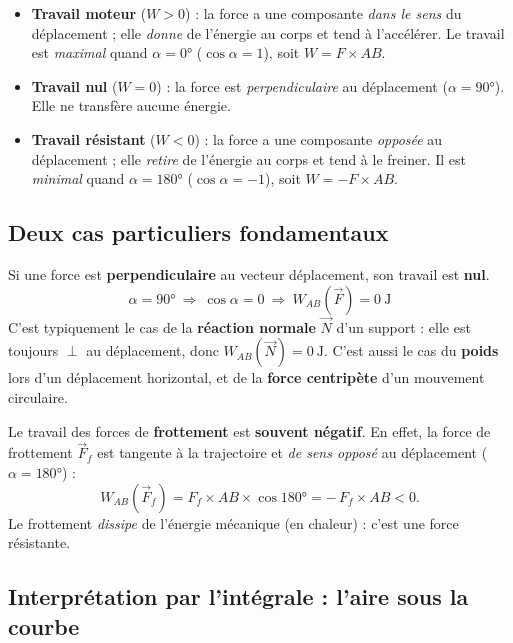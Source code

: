 \documentclass[11pt,a4paper]{article}
\newcommand{\vv}[1]{\vec{#1}}
\newcommand{\J}{\si{\joule}}
\begin{document}
\begin{itemize}[leftmargin=1.6em,topsep=2pt,itemsep=3pt]
  \item \textbf{Travail moteur} ($W>0$) : la force a une composante \emph{dans le sens} du
        déplacement ; elle \emph{donne} de l'énergie au corps et tend à l'accélérer. Le travail est
        \emph{maximal} quand $\alpha=\ang{0}$ ($\cos\alpha=1$), soit $W=F\times AB$.
  \item \textbf{Travail nul} ($W=0$) : la force est \emph{perpendiculaire} au déplacement
        ($\alpha=\ang{90}$). Elle ne transfère aucune énergie.
  \item \textbf{Travail résistant} ($W<0$) : la force a une composante \emph{opposée} au
        déplacement ; elle \emph{retire} de l'énergie au corps et tend à le freiner. Il est
        \emph{minimal} quand $\alpha=\ang{180}$ ($\cos\alpha=-1$), soit $W=-F\times AB$.
\end{itemize}

\subsection{Deux cas particuliers fondamentaux}

\begin{theoreme}
Si une force est \textbf{perpendiculaire} au vecteur déplacement, son travail est \textbf{nul}.
\[
\alpha=\ang{90}\ \Rightarrow\ \cos\alpha=0\ \Rightarrow\ W_{AB}(\vv F)=0\ \J
\]
C'est typiquement le cas de la \textbf{réaction normale} $\vv N$ d'un support : elle est toujours
$\perp$ au déplacement, donc $W_{AB}(\vv N)=\SI{0}{\joule}$. C'est aussi le cas du \textbf{poids}
lors d'un déplacement horizontal, et de la \textbf{force centripète} d'un mouvement circulaire.
\end{theoreme}

\begin{theoreme}
Le travail des forces de \textbf{frottement} est \textbf{souvent négatif}. En effet, la force de
frottement $\vv F_f$ est tangente à la trajectoire et \emph{de sens opposé} au déplacement
($\alpha=\ang{180}$) :
\[
W_{AB}(\vv F_f)=F_f\times AB\times\cos\ang{180}=-\,F_f\times AB <0 .
\]
Le frottement \emph{dissipe} de l'énergie mécanique (en chaleur) : c'est une force résistante.
\end{theoreme}

\subsection{Interprétation par l'intégrale : l'aire sous la courbe}
\end{document}
